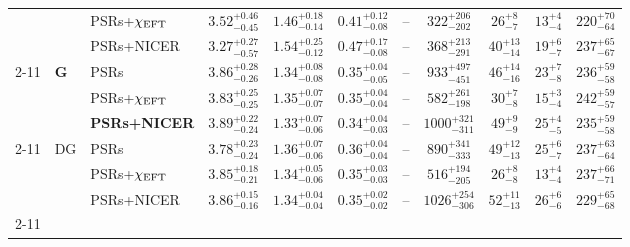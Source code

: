 \begin{tabular}{|l|l|l|c|c|c|c|c|c|c|c|}
 &  & PSRs+$\chi_{\rm{EFT}}$ & $3.52_{-0.45}^{+0.46}$ & $1.46_{-0.14}^{+0.18}$ & $0.41_{-0.08}^{+0.12}$ & -- & $322_{-202}^{+206}$ & $26_{-7}^{+8}$ & $13_{-4}^{+4}$ & $220_{-64}^{+70}$ \\
 &  & PSRs+NICER & $3.27_{-0.57}^{+0.27}$ & $1.54_{-0.12}^{+0.25}$ & $0.47_{-0.08}^{+0.17}$ & -- & $368_{-291}^{+213}$ & $40_{-14}^{+13}$ & $19_{-7}^{+6}$ & $237_{-67}^{+65}$ \\
\cline{2-11}
 & \multirow{3}{*}{\textbf{G}} & PSRs & $3.86_{-0.26}^{+0.28}$ & $1.34_{-0.08}^{+0.08}$ & $0.35_{-0.05}^{+0.04}$ & -- & $933_{-451}^{+497}$ & $46_{-16}^{+14}$ & $23_{-8}^{+7}$ & $236_{-58}^{+59}$ \\
 &  & PSRs+$\chi_{\rm{EFT}}$ & $3.83_{-0.25}^{+0.25}$ & $1.35_{-0.07}^{+0.07}$ & $0.35_{-0.04}^{+0.04}$ & -- & $582_{-198}^{+261}$ & $30_{-8}^{+7}$ & $15_{-4}^{+3}$ & $242_{-57}^{+59}$ \\
 &  & \textbf{PSRs+NICER} & \textbf{$3.89_{-0.24}^{+0.22}$} & \textbf{$1.33_{-0.06}^{+0.07}$} & \textbf{$0.34_{-0.03}^{+0.04}$} & -- & \textbf{$1000_{-311}^{+321}$} & \textbf{$49_{-9}^{+9}$} & \textbf{$25_{-5}^{+4}$} & \textbf{$235_{-58}^{+59}$} \\
\cline{2-11}
 & \multirow{3}{*}{DG} & PSRs & $3.78_{-0.24}^{+0.23}$ & $1.36_{-0.06}^{+0.07}$ & $0.36_{-0.04}^{+0.04}$ & -- & $890_{-333}^{+341}$ & $49_{-13}^{+12}$ & $25_{-7}^{+6}$ & $237_{-64}^{+63}$ \\
 &  & PSRs+$\chi_{\rm{EFT}}$ & $3.85_{-0.21}^{+0.18}$ & $1.34_{-0.06}^{+0.05}$ & $0.35_{-0.03}^{+0.03}$ & -- & $516_{-205}^{+194}$ & $26_{-8}^{+8}$ & $13_{-4}^{+4}$ & $237_{-71}^{+66}$ \\
 &  & PSRs+NICER & $3.86_{-0.16}^{+0.15}$ & $1.34_{-0.04}^{+0.04}$ & $0.35_{-0.02}^{+0.02}$ & -- & $1026_{-306}^{+254}$ & $52_{-13}^{+11}$ & $26_{-6}^{+6}$ & $229_{-68}^{+65}$ \\
\cline{2-11}
\hline
\end{tabular}